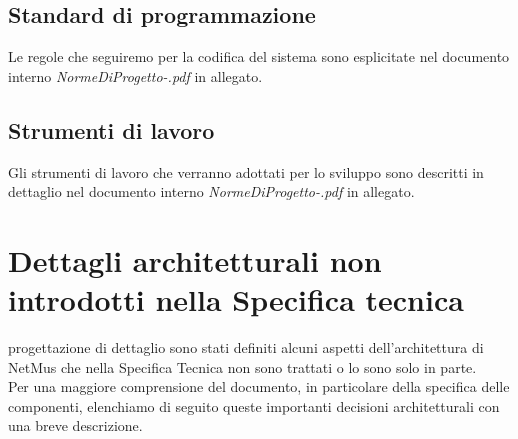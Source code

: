 \section{Standard di programmazione}
Le regole che seguiremo per la codifica del sistema sono esplicitate nel
documento interno \emph{NormeDiProgetto-\versionenormeprogetto.pdf} in allegato.

\section{Strumenti di lavoro}
Gli strumenti di lavoro che verranno adottati per lo sviluppo sono descritti in
dettaglio nel documento interno \emph{NormeDiProgetto-\versionenormeprogetto.pdf} in
allegato.


\chapter{Dettagli architetturali non introdotti nella Specifica tecnica}
\thispagestyle{fancy} %
progettazione di dettaglio sono stati definiti alcuni aspetti dell'architettura
di NetMus che nella Specifica Tecnica non sono trattati o lo sono solo in
parte.\\ Per una maggiore comprensione del documento, in particolare della
specifica delle componenti, elenchiamo di seguito queste importanti decisioni
architetturali con una breve descrizione.
